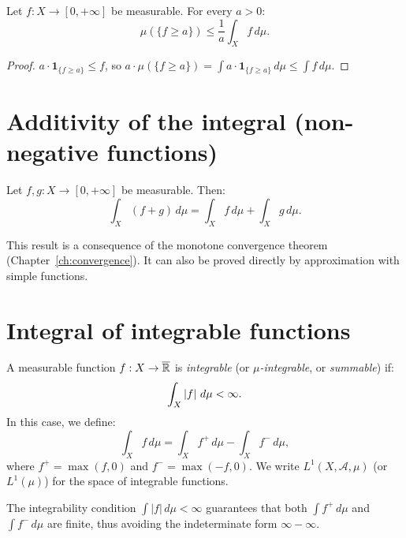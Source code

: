 \begin{theorem}
\label{thm:markov}
Let $f : X \to [0, +\infty]$ be measurable. For every $a > 0$:
\[
\mu(\{f \geq a\}) \leq \frac{1}{a} \int_X f\, d\mu.
\]
\end{theorem}

\begin{proof}
$a \cdot \mathbf{1}_{\{f \geq a\}} \leq f$, so
$a \cdot \mu(\{f \geq a\}) = \int a \cdot \mathbf{1}_{\{f \geq a\}}\, d\mu
\leq \int f\, d\mu$.
\end{proof}

\section{Additivity of the integral (non-negative functions)}

\begin{theorem}
\label{thm:positive_additivity}
Let $f, g : X \to [0, +\infty]$ be measurable. Then:
\[
\int_X (f + g)\, d\mu = \int_X f\, d\mu + \int_X g\, d\mu.
\]
\end{theorem}

This result is a consequence of the monotone convergence theorem
(Chapter~\ref{ch:convergence}). It can also be proved directly by approximation
with simple functions.

\section{Integral of integrable functions}

\begin{definition}
A measurable function $f : X \to \overline{\mathbb{R}}$ is \emph{integrable} (or
\emph{$\mu$-integrable}, or \emph{summable}) if:
\[
\int_X \left| f \right|\, d\mu < \infty.
\]
In this case, we define:
\[
\int_X f\, d\mu = \int_X f^+\, d\mu - \int_X f^-\, d\mu,
\]
where $f^+ = \max(f, 0)$ and $f^- = \max(-f, 0)$. We write
$L^1(X, \mathcal{A}, \mu)$ (or $L^1(\mu)$) for the space of integrable functions.
\end{definition}

\begin{warning}[title=\textbf{The form $\infty - \infty$ is forbidden}]
The integrability condition $\int |f|\, d\mu < \infty$ guarantees that both
$\int f^+\, d\mu$ and $\int f^-\, d\mu$ are finite, thus avoiding the
indeterminate form $\infty - \infty$.
\end{warning}


